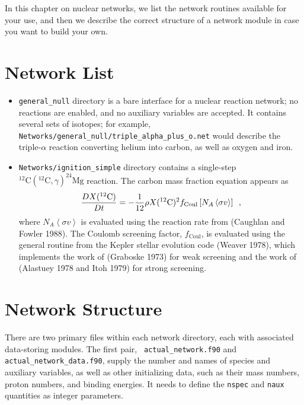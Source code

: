 
In this chapter on nuclear networks, we list the network routines
available for your use, and then we describe the correct structure of
a network module in case you want to build your own.

\section{Network List}

\begin{itemize}

\item {\tt general\_null} directory is a bare interface for a nuclear
  reaction network; no reactions are enabled, and no auxiliary
  variables are accepted. It contains several sets of isotopes; for
  example, {\tt Networks/general\_null/triple\_alpha\_plus\_o.net}
  would describe the triple-$\alpha$ reaction converting helium into
  carbon, as well as oxygen and iron.

\item {\tt Networks/ignition\_simple} directory contains a single-step
  $^{12}\mathrm{C}(^{12}\mathrm{C},\gamma)^{24}\mathrm{Mg}$ reaction.
  The carbon mass fraction equation appears as
\begin{equation}
\frac{D X(^{12}\mathrm{C})}{Dt} = - \frac{1}{12} \rho X(^{12}\mathrm{C})^2
    f_\mathrm{Coul} \left [N_A \left <\sigma v \right > \right]\enskip,
\end{equation}
where $N_A \left <\sigma v\right>$ is evaluated using the reaction
rate from (Caughlan and Fowler 1988).  The Coulomb screening factor,
$f_\mathrm{Coul}$, is evaluated using the general routine from the
Kepler stellar evolution code (Weaver 1978), which implements the work
of (Graboske 1973) for weak screening and the work of (Alastuey 1978
and Itoh 1979) for strong screening.

\end{itemize}

\section{Network Structure}

There are two primary files within each network directory, each with
associated data-storing modules. The first pair, {\tt
  actual\_network.f90} and {\tt actual\_network\_data.f90}, supply the
number and names of species and auxiliary variables, as well as other
initializing data, such as their mass numbers, proton numbers, and
binding energies. It needs to define the {\tt nspec} and {\tt naux}
quantities as integer parameters.

